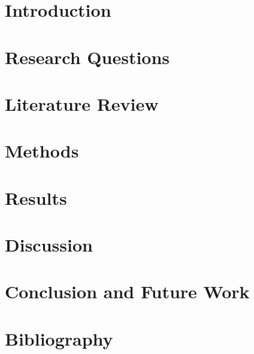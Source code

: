 \documentclass[acmlarge,screen]{acmart}
\begin{document}
%

%

%
\maketitle

\newpage
\section{Introduction}


\newpage
\section{Research Questions}


\newpage
\section{Literature Review}


\newpage
\section{Methods}







\newpage
\section{Results}






\newpage
\section{Discussion}

\newpage
\section{Conclusion and Future Work}

\newpage
\section{Bibliography}


\newpage
\end{document}
